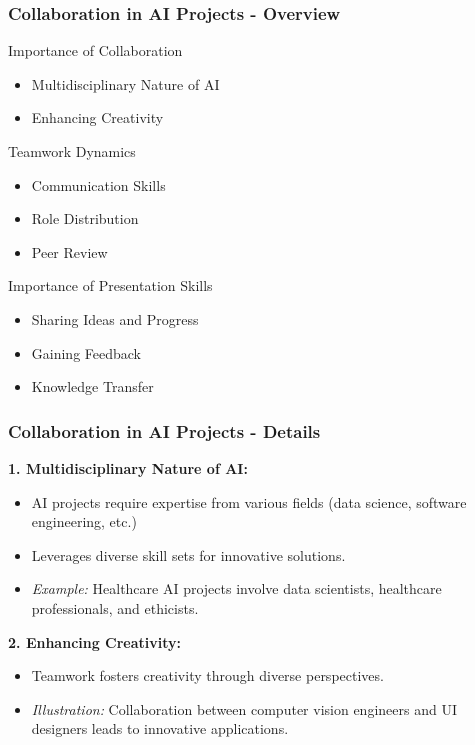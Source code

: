 \documentclass[aspectratio=169]{beamer}
\begin{document}
\begin{frame}[fragile]
    \frametitle{Collaboration in AI Projects - Overview}
    \begin{block}{Importance of Collaboration}
        \begin{itemize}
            \item Multidisciplinary Nature of AI
            \item Enhancing Creativity
        \end{itemize}
    \end{block}
    \begin{block}{Teamwork Dynamics}
        \begin{itemize}
            \item Communication Skills
            \item Role Distribution
            \item Peer Review
        \end{itemize}
    \end{block}
    \begin{block}{Importance of Presentation Skills}
        \begin{itemize}
            \item Sharing Ideas and Progress
            \item Gaining Feedback
            \item Knowledge Transfer
        \end{itemize}
    \end{block}
\end{frame}

\begin{frame}[fragile]
    \frametitle{Collaboration in AI Projects - Details}
    \textbf{1. Multidisciplinary Nature of AI:}
    \begin{itemize}
        \item AI projects require expertise from various fields (data science, software engineering, etc.)
        \item Leverages diverse skill sets for innovative solutions.
        \item \textit{Example:} Healthcare AI projects involve data scientists, healthcare professionals, and ethicists.
    \end{itemize}

    \textbf{2. Enhancing Creativity:}
    \begin{itemize}
        \item Teamwork fosters creativity through diverse perspectives.
        \item \textit{Illustration:} Collaboration between computer vision engineers and UI designers leads to innovative applications.
    \end{itemize}
\end{frame}
\end{document}
